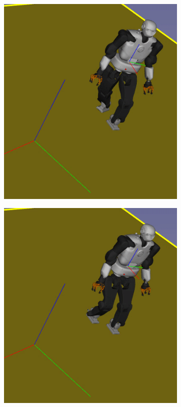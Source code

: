 \begin{figure}[h]
\begin{subfigure}[t]{0.19\linewidth}
        \includegraphics[width=\textwidth,trim={3cm 3cm 0 0}, clip] {Figures/Chapter_CPSB/sidewalk_seq/frame_1.png}
    \end{subfigure}
    \begin{subfigure}[t]{0.19\linewidth}
        \includegraphics[width=\textwidth,trim={3cm 3cm 0 0}, clip] {Figures/Chapter_CPSB/sidewalk_seq/frame_2.png}

\end{subfigure}
\end{figure}

